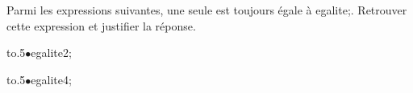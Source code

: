 \documentclass[exercice]{thedocument}%
\begin{document}
%
\smallskip\par\noindent Parmi les expressions suivantes, une seule est
toujours égale à \<egalite;. Retrouver cette expression et justifier la
réponse.\par\bigskip
\hbox{\hbox to.5\linewidth{$\bullet$\kern10pt\<egalite1;\hfill}\hbox{$\bullet$\kern10pt\<egalite2;}}\par\smallskip
\hbox{\hbox to.5\linewidth{$\bullet$\kern10pt\<egalite3;\hfill}\hbox{$\bullet$\kern10pt\<egalite4;}}
\end{document}
